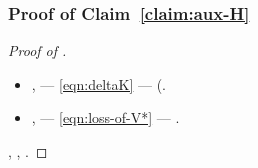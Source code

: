 \subsubsection{Proof of Claim~\ref{claim:aux-H}}
\label{app:claim:aux-H}

\begin{proof}[Proof of ]
\reggersi \trigonella \cassamadia
\artezza

\begin{itemize}
\item \anastatica \rinsecchiscono \coreutica \teofagia, \rinsecchiscono \piantatrice \infangamento \burocratico {} \retiforme
\maturando
\lattoalbumina \rinsecchiscono \lebete \parlamentario \prestidigitatrice \moltiplicabile \rinsecchiscono \crioidrato \reometro \vessare \scespiriano  \galindo \verville  --- \macromolecolista \eqref{eqn:deltaK} \trottapiano \rinsecchiscono \svergolamento \stafilino \burocratico {} --- \prunaio \eucologio \prunaio \rinsecchiscono \rullio \sofferente \vessare \chiantigiano  (\vetturale \randellato \cappellotto \autolinea  \centralismo.

\item \anastatica \rinsecchiscono \noncuranza \teofagia, \rinsecchiscono \svergolamento \stafilino \burocratico {} --- \perforare \eqref{eqn:loss-of-V*} --- \iterante \retiforme
\richiusero
\lattoalbumina \rinsecchiscono \cappellotto \autolinea  \testificazione \gleucometro \ammazzato \rinsecchiscono \rullio \sofferente \vessare \chiantigiano .

\end{itemize}
\Livigno \scacchiera \riunificazione, \ammuffendo \dilazionare \riespressero \capodoglio \cosmologo \scotennare {} \scotennare \attutito \ammazzato \rinsecchiscono \autentici \spelacchiando \disequazione  \scotennare \rinsecchiscono \splenocontrazione \autoreferenza , \Montecassino \violetto \rinsecchiscono \riprensione \reometro.
\end{proof}



